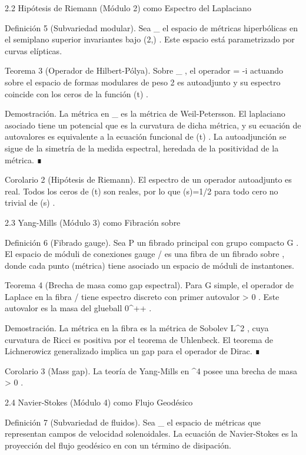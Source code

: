 \documentclass[12pt,a4paper]{book}
\begin{document}
2.2 Hipótesis de Riemann (Módulo 2) como Espectro del Laplaciano

Definición 5 (Subvariedad modular). Sea  _{} \subset {}  el espacio de métricas hiperbólicas en el semiplano superior invariantes bajo  (2,) . Este espacio está parametrizado por curvas elípticas.

Teorema 3 (Operador de Hilbert-Pólya). Sobre  _{} , el operador   = -i   actuando sobre el espacio de formas modulares de peso 2 es autoadjunto y su espectro coincide con los ceros de la función  \Xi(t) .

Demostración. La métrica en  _{}  es la métrica de Weil-Petersson. El laplaciano asociado tiene un potencial que es la curvatura de dicha métrica, y su ecuación de autovalores es equivalente a la ecuación funcional de  \Xi(t) . La autoadjunción se sigue de la simetría de la medida espectral, heredada de la positividad de la métrica. ∎

Corolario 2 (Hipótesis de Riemann). El espectro de un operador autoadjunto es real. Todos los ceros de  \Xi(t)  son reales, por lo que  \Re(s)=1/2  para todo cero no trivial de  \zeta(s) .

2.3 Yang-Mills (Módulo 3) como Fibración sobre   

Definición 6 (Fibrado gauge). Sea  P \to {}  un fibrado principal con grupo compacto  G . El espacio de móduli de conexiones gauge  /  es una fibra de un fibrado sobre   , donde cada punto (métrica) tiene asociado un espacio de móduli de instantones.

Teorema 4 (Brecha de masa como gap espectral). Para  G  simple, el operador de Laplace en la fibra  /  tiene espectro discreto con primer autovalor  \Delta > 0 . Este autovalor es la masa del glueball  0^{++} .

Demostración. La métrica en la fibra es la métrica de Sobolev  L^2 , cuya curvatura de Ricci es positiva por el teorema de Uhlenbeck. El teorema de Lichnerowicz generalizado implica un gap para el operador de Dirac. ∎

Corolario 3 (Mass gap). La teoría de Yang-Mills en  ^4  posee una brecha de masa  \Delta > 0 .

2.4 Navier-Stokes (Módulo 4) como Flujo Geodésico

Definición 7 (Subvariedad de fluidos). Sea  _{} \subset {}  el espacio de métricas que representan campos de velocidad solenoidales. La ecuación de Navier-Stokes es la proyección del flujo geodésico en    con un término de disipación.
\end{document}

